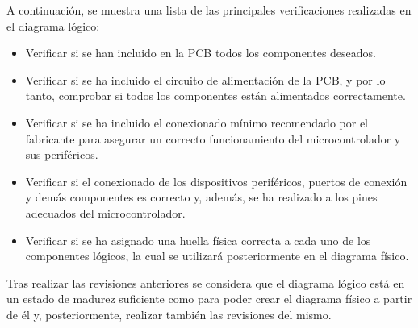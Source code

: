 A continuación, se muestra una lista de las principales verificaciones realizadas en el diagrama lógico:
\begin{itemize}

    \item Verificar si se han incluido en la \ac{PCB} todos los componentes deseados.
    
    \item Verificar si se ha incluido el circuito de alimentación de la \ac{PCB}, y por lo tanto, comprobar si todos los componentes están alimentados correctamente.
    
    \item Verificar si se ha incluido el conexionado mínimo recomendado por el fabricante para asegurar un correcto funcionamiento del microcontrolador y sus periféricos.
    
    \item Verificar si el conexionado de los dispositivos periféricos, puertos de conexión y demás componentes es correcto y, además, se ha realizado a los pines adecuados del microcontrolador.
    
    \item Verificar si se ha asignado una huella física correcta a cada uno de los componentes lógicos, la cual se utilizará posteriormente en el diagrama físico.
    
\end{itemize}

Tras realizar las revisiones anteriores se considera que el diagrama lógico está en un estado de madurez suficiente como para poder crear el diagrama físico a partir de él y, posteriormente, realizar también las revisiones del mismo.

